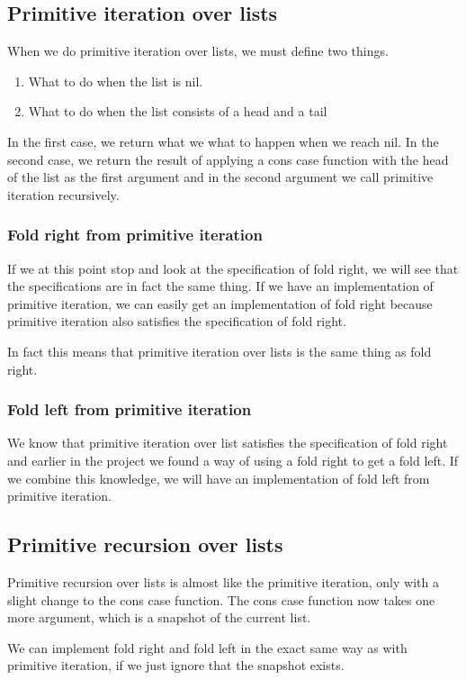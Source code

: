\documentclass[a4paper]{article}
\begin{document}
\subsection{Primitive iteration over lists}
When we do primitive iteration over lists, we must define two things.
\begin{enumerate}
  \item What to do when the list is nil.
  \item What to do when the list consists of a head and a tail
\end{enumerate}

In the first case, we return what we what to happen when we reach nil. In the
second case, we return the result of applying a cons case function with the head
of the list as the first argument and in the second argument we call primitive
iteration recursively.

\subsubsection{Fold right from primitive iteration}
If we at this point stop and look at the specification of fold right, we will
see that the specifications are in fact the same thing. If we have an
implementation of primitive iteration, we can easily get an implementation of
fold right because primitive iteration also satisfies the specification of fold
right.

In fact this means that primitive iteration over lists is the same thing as fold
right.

\subsubsection{Fold left from primitive iteration}
We know that primitive iteration over list satisfies the specification of fold
right and earlier in the project we found a way of using a fold right to get a
fold left. If we combine this knowledge, we will have an implementation of fold
left from primitive iteration.

\subsection{Primitive recursion over lists}
Primitive recursion over lists is almost like the primitive iteration, only with
a slight change to the cons case function. The cons case function now takes one
more argument, which is a snapshot of the current list.

We can implement fold right and fold left in the exact same way as with
primitive iteration, if we just ignore that the snapshot exists.
\end{document}
